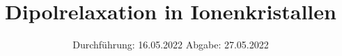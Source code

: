 

\subject{Versuch Nr.V48}
\title{Dipolrelaxation in Ionenkristallen}
\date{%
  Durchführung: 16.05.2022
  \hspace{3em}
  Abgabe: 27.05.2022
}



\maketitle
\thispagestyle{empty}
\tableofcontents
\newpage 








\nocite{*}

\printbibliography{}


